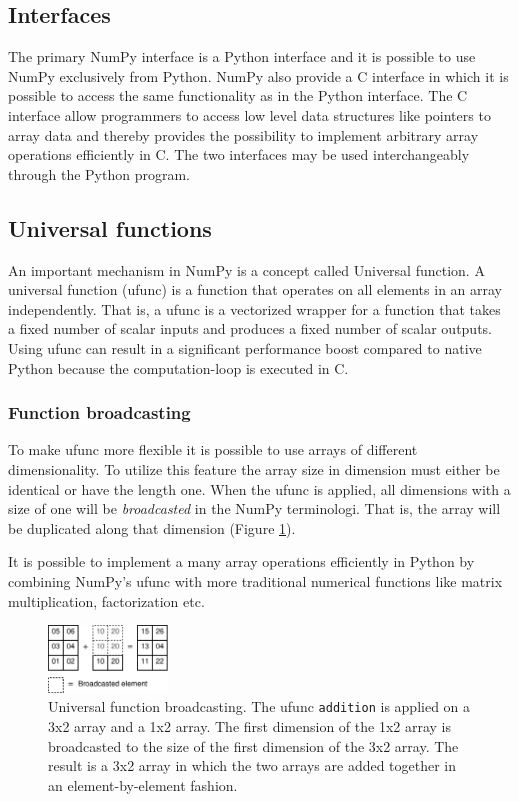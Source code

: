 \documentclass[10pt]{article}
\begin{document}
\subsection{Interfaces}
The primary NumPy interface is a Python interface and it is possible to use NumPy exclusively from Python. NumPy also provide a C interface in which it is possible to access the same functionality as in the Python interface. The C interface allow programmers to access low level data structures like pointers to array data and thereby provides the possibility to implement arbitrary array operations efficiently in C. The two interfaces may be used interchangeably through the Python program.

\subsection{Universal functions}
An important mechanism in NumPy is a concept called Universal function. A universal function (ufunc) is a function that operates on all elements in an array independently. That is, a ufunc is a vectorized wrapper for a function that takes a fixed number of scalar inputs and produces a fixed number of scalar outputs. Using ufunc can result in a significant performance boost compared to native Python because the computation-loop is executed in C.

\subsubsection{Function broadcasting}
To make ufunc more flexible it is possible to use arrays of different dimensionality. To utilize this feature the array size in dimension must either be identical or have the length one. When the ufunc is applied, all dimensions with a size of one will be \emph{broadcasted} in the NumPy terminologi. That is, the array will be duplicated along that dimension (Figure \ref{fig:ufunc_broadcast}).

It is possible to implement a many array operations efficiently in Python by combining NumPy's ufunc with more traditional numerical functions like matrix multiplication, factorization etc.

\begin{figure}
 \centering
 \includegraphics[width=120px]{gfx/ufunc_broadcast}
 \caption{Universal function broadcasting. The ufunc \texttt{addition} is applied on a 3x2 array and a 1x2 array. The first dimension of the 1x2 array is broadcasted to the size of the first dimension of the 3x2 array. The result is a 3x2 array in which the two arrays are added together in an element-by-element fashion.}
 \label{fig:ufunc_broadcast}
\end{figure}
\end{document}
